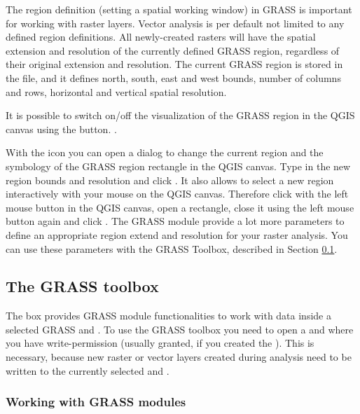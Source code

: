 The region definition (setting a spatial working window) in GRASS is important 
for working with raster layers. Vector analysis is per default not limited
to any defined region definitions. All newly-created rasters will have the
spatial extension and resolution of the currently defined GRASS region,
regardless of their original extension and resolution. The current GRASS
region is stored in the  file, and it 
defines north, south, east and west bounds, number of columns and rows, 
horizontal and vertical spatial resolution.

It is possible to switch on/off the visualization of the GRASS region in the
QGIS canvas using the 
button. .

With the  icon you 
can open a dialog to change the current region and the symbology of the GRASS 
region rectangle in the QGIS canvas. Type in the new region bounds and 
resolution and click . It also allows to select a new region 
interactively with your mouse on the QGIS canvas. Therefore click with the 
left mouse button in the QGIS canvas, open a rectangle, close it using the 
left mouse button again and click .
The GRASS module  provide a lot more parameters to define 
an appropriate region extend and resolution for your raster analysis. You can 
use these parameters with the GRASS Toolbox, described in Section 
\ref{subsec:grass_toolbox}.

\subsection{The GRASS toolbox}\label{subsec:grass_toolbox}

The  box provides GRASS module 
functionalities to work with data inside a selected GRASS  
and . To use the GRASS toolbox you need to open a 
 and  where you have write-permission 
(usually granted, if you created the ). This is necessary, 
because new raster or vector layers created during analysis need to be written 
to the currently selected  and .

\subsubsection{Working with GRASS modules}

